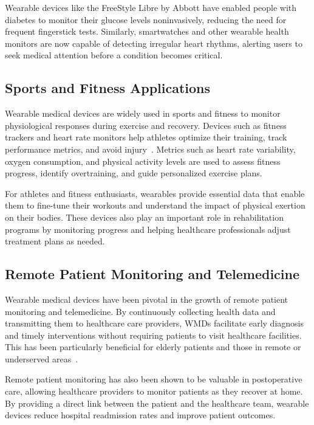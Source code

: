 \documentclass[journal]{IEEEtran}
\begin{document}
    Wearable devices like the FreeStyle Libre by Abbott have enabled people with diabetes to monitor their glucose levels noninvasively, reducing the need for frequent fingerstick tests. Similarly, smartwatches and other wearable health monitors are now capable of detecting irregular heart rhythms, alerting users to seek medical attention before a condition becomes critical.

    \subsection{Sports and Fitness Applications}

    Wearable medical devices are widely used in sports and fitness to monitor physiological responses during exercise and recovery. Devices such as fitness trackers and heart rate monitors help athletes optimize their training, track performance metrics, and avoid injury~\cite{Iqbal2016}. Metrics such as heart rate variability, oxygen consumption, and physical activity levels are used to assess fitness progress, identify overtraining, and guide personalized exercise plans.

    For athletes and fitness enthusiasts, wearables provide essential data that enable them to fine-tune their workouts and understand the impact of physical exertion on their bodies. These devices also play an important role in rehabilitation programs by monitoring progress and helping healthcare professionals adjust treatment plans as needed.

    \subsection{Remote Patient Monitoring and Telemedicine}

    Wearable medical devices have been pivotal in the growth of remote patient monitoring and telemedicine. By continuously collecting health data and transmitting them to healthcare care providers, WMDs facilitate early diagnosis and timely interventions without requiring patients to visit healthcare facilities. This has been particularly beneficial for elderly patients and those in remote or underserved areas~\cite{Nahavandi2022}.

    Remote patient monitoring has also been shown to be valuable in postoperative care, allowing healthcare providers to monitor patients as they recover at home. By providing a direct link between the patient and the healthcare team, wearable devices reduce hospital readmission rates and improve patient outcomes.
\end{document}

